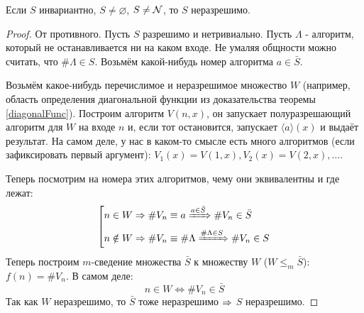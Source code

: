 \begin{theorem}\label{UspenskyRice}
	Если $S$ инвариантно, $S \ne \varnothing$, $S \ne \mathcal{N}$, то $S$ неразрешимо.
\end{theorem}
\begin{proof}
	От противного.
	Пусть $S$ разрешимо и нетривиально.
	Пусть $\Lambda$ - алгоритм, который не останавливается ни на каком входе.
	Не умаляя общности можно считать, что $\#\Lambda \in S$.
	Возьмём какой-нибудь номер алгоритма $a \in \bar{S}$.

	Возьмём какое-нибудь перечислимое и неразрешимое множество $W$ (например, область определения диагональной функции из доказательства теоремы \ref{diagonalFunc}).
	Построим алгоритм $V(n, x)$, он запускает полуразрешающий алгоритм для $W$ на входе $n$ и, если тот остановится, запускает $\langle a \rangle(x)$ и выдаёт результат.
	На самом деле, у нас в каком-то смысле есть много алгоритмов (если зафиксировать первый аргумент): $V_1(x)=V(1, x), V_2(x)=V(2, x), \dots$.

	Теперь посмотрим на номера этих алгоритмов, чему они эквивалентны и где лежат:
	\[
		\left[
			\begin{aligned}
			n \in W &\Rightarrow \#V_n \equiv a \xRightarrow{a \in \bar S} \#V_n \in \bar S \\
			n \notin W &\Rightarrow \#V_n \equiv \#\Lambda \xRightarrow{\#\Lambda \in S} \#V_n \in S
			\end{aligned}
		\right.
	\]
	Теперь построим $m$-сведение множества $\bar{S}$ к множеству $W$ ($W \le_m \bar S$): $f(n) = \#V_n$.
	В самом деле:
	\[ n \in W \iff \#V_n \in \bar S \]
	Так как $W$ неразрешимо, то $\bar S$ тоже неразрешимо $\Rightarrow$ $S$ неразрешимо.
\end{proof}
